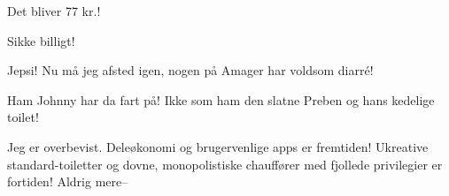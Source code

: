 \documentclass[a4paper,11pt]{article}
\begin{document}
\begin{sketch}
 Det bliver  77 kr.!

 Sikke billigt!

 Jepsi!  Nu må jeg afsted igen, nogen på Amager har voldsom
diarré!


 Ham Johnny har da fart på!  Ikke som ham den slatne Preben og hans kedelige toilet!


 Jeg er overbevist.  Deleøkonomi og brugervenlige apps er fremtiden!  Ukreative standard-toiletter og dovne, monopolistiske chauffører med fjollede privilegier er fortiden!  Aldrig mere-- 




\end{sketch}
\end{document}
